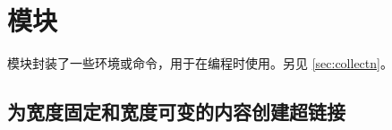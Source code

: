 \documentclass[twoside]{book}
\begin{document}





\section{模块}\label{sec:module-box-prog}

 模块封装了一些环境或命令，用于在编程时使用。另见 \cref{sec:collectn}。

\subsection{为宽度固定和宽度可变的内容创建超链接}
\end{document}
